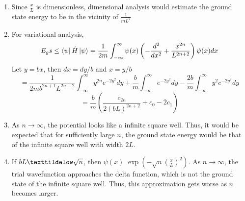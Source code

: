 \begin{sol}
\begin{enumerate}[label=\textbf{(\alph*)}]
\item
Since $\frac{x}{L}$ is dimensionless, dimensional analysis would estimate the ground state energy to be in the vicinity of $\frac{1}{mL^2}$
\item
For variational analysis, 
\begin{equation}
	E_gs\leq\bra\psi\hat H\ket\psi=\frac{1}{2m}\int_{-\infty}^\infty \psi(x)\left(-\frac{d^2}{dx^2}+\frac{x^{2n}}{L^{2n+2}}\right)\psi(x)dx
\end{equation}
Let $y=bx$, then $dx=dy/b$ and $x=y/b$
\begin{equation}
	=\frac{1}{2mb^{2n+1}L^{2n+2}}\int_{-\infty}^\infty y^{2n}e^{-2y^2}dy+\frac{b}{m}\int_{-\infty}^\infty e^{-2y^2}dy-\frac{2b}{m}\int_{-\infty}^\infty y^2e^{-2y^2}dy
\end{equation} \begin{equation}
	=\frac{b}{m}\left(\frac{c_{2n}}{2(bL)^{2n+2}}+c_0-2c_1\right)
\end{equation}
\item
As $n\to\infty$, the potential looks like a infinite square well. Thus, it would be expected that for sufficiently large $n$, the ground state energy would be that of the infinite square well with width $2L$.
\item
If $bL\texttildelow\sqrt{n}$,  then $\psi(x)\text{~}\exp\left(-\sqrt{n}(\frac{x}{L})^2\right)$. As $n\to\infty$, the trial wavefunction approaches the delta function, which is not the ground state of the infinite square well. Thus, this approximation gets worse as $n$ becomes larger.
\end{enumerate}
\end{sol}